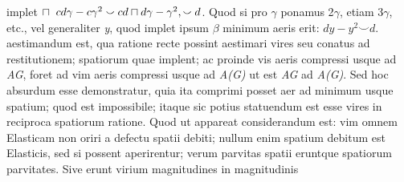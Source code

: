 implet $\sqcap\hspace{5.5pt} cd\gamma-c\gamma^2\smallsmile cd\sqcap d\gamma-\gamma^2, \smallsmile d$. Quod si pro $\gamma$ ponamus 2$\gamma$,  etiam 3$\gamma$, etc., vel generaliter \textit{y},  quod implet ipsum $\beta$ minimum aeris erit: $dy-y^2\smallsmile d$.  aestimandum est, qua ratione recte possint aestimari vires seu conatus\protect{} ad restitutionem;  spatiorum quae implent; ac proinde vis aeris compressi\protect{} usque ad \textit{AG}, foret ad vim aeris compressi\protect{} usque ad \textit{A(G)} ut est \textit{AG} ad \textit{A(G)}. Sed hoc absurdum esse demonstratur, quia ita 
                        comprimi posset aer ad minimum usque spatium; quod est impossibile; itaque sic potius statuendum est esse vires in reciproca spatiorum ratione. Quod ut appareat considerandum est: vim\protect{} omnem Elasticam non oriri a defectu spatii debiti; nullum enim spatium debitum est Elasticis, sed si possent  aperirentur; verum parvitas spatii eruntque  spatiorum parvitates. Sive erunt virium magnitudines in magnitudinis 
